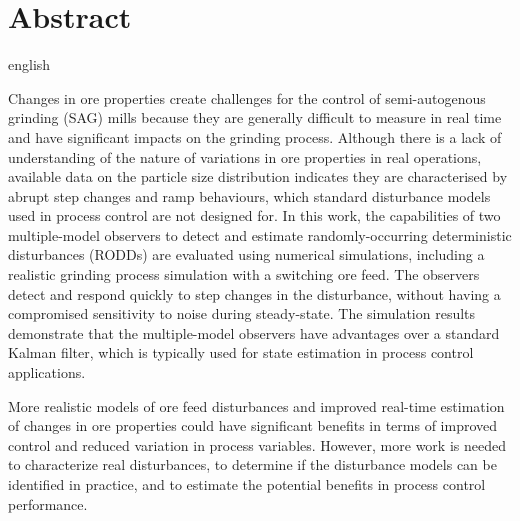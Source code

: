 \chapter*{Abstract}             %
\label{chap-abstract}           %

\begin{otherlanguage*}{english}
  
  Changes in ore properties create challenges for the control of semi-autogenous grinding (SAG) mills because they are generally difficult to measure in real time and have significant impacts on the grinding process. Although there is a lack of understanding of the nature of variations in ore properties in real operations, available data on the particle size distribution indicates they are characterised by abrupt step changes and ramp behaviours, which standard disturbance models used in process control are not designed for. In this work, the capabilities of two multiple-model observers to detect and estimate randomly-occurring deterministic disturbances (\gls{RODD}s) are evaluated using numerical simulations, including a realistic grinding process simulation with a switching ore feed. The observers detect and respond quickly to step changes in the disturbance, without having a compromised sensitivity to noise during steady-state. The simulation results demonstrate that the multiple-model observers have advantages over a standard Kalman filter, which is typically used for state estimation in process control applications. 
  
  More realistic models of ore feed disturbances and improved real-time estimation of changes in ore properties could have significant benefits in terms of improved control and reduced variation in process variables. However, more work is needed to characterize real disturbances, to determine if the disturbance models can be identified in practice, and to estimate the potential benefits in process control performance.
\end{otherlanguage*}
